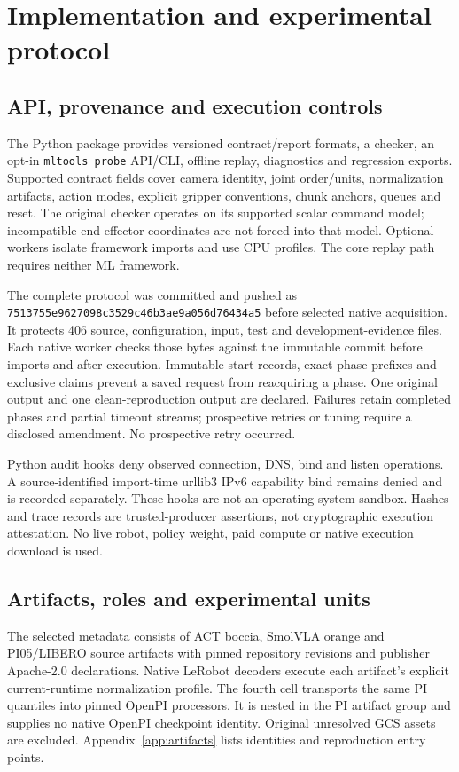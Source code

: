\section{Implementation and experimental protocol}
\subsection{API, provenance and execution controls}
The Python package provides versioned contract/report formats, a checker, an opt-in \texttt{mltools probe} API/CLI, offline replay, diagnostics and regression exports. Supported contract fields cover camera identity, joint order/units, normalization artifacts, action modes, explicit gripper conventions, chunk anchors, queues and reset. The original checker operates on its supported scalar command model; incompatible end-effector coordinates are not forced into that model. Optional workers isolate framework imports and use CPU profiles. The core replay path requires neither ML framework.

The complete protocol was committed and pushed as \texttt{7513755e9627098c3529c46b3ae9a056d76434a5} before selected native acquisition. It protects 406 source, configuration, input, test and development-evidence files. Each native worker checks those bytes against the immutable commit before imports and after execution. Immutable start records, exact phase prefixes and exclusive claims prevent a saved request from reacquiring a phase. One original output and one clean-reproduction output are declared. Failures retain completed phases and partial timeout streams; prospective retries or tuning require a disclosed amendment. No prospective retry occurred.

Python audit hooks deny observed connection, DNS, bind and listen operations. A source-identified import-time urllib3 IPv6 capability bind remains denied and is recorded separately. These hooks are not an operating-system sandbox. Hashes and trace records are trusted-producer assertions, not cryptographic execution attestation. No live robot, policy weight, paid compute or native execution download is used.

\subsection{Artifacts, roles and experimental units}
The selected metadata consists of ACT boccia, SmolVLA orange and PI05/LIBERO source artifacts with pinned repository revisions and publisher Apache-2.0 declarations. Native LeRobot decoders execute each artifact's explicit current-runtime normalization profile. The fourth cell transports the same PI quantiles into pinned OpenPI processors. It is nested in the PI artifact group and supplies no native OpenPI checkpoint identity. Original unresolved GCS assets are excluded. Appendix~\ref{app:artifacts} lists identities and reproduction entry points.


